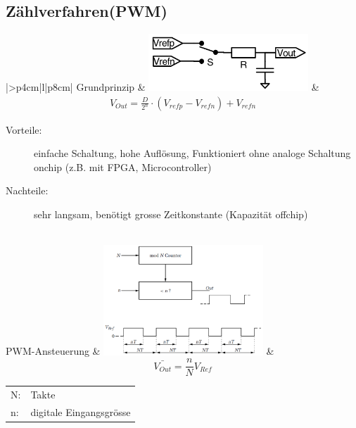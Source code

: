 \subsection{Zählverfahren(PWM)}
\begin{longtable}{|>{\bfseries}p{4cm}|l|p{8cm}|}
	\hline 
	Grundprinzip \hartl{466}
	& \includegraphics[width=6cm, valign=t]{./pictures/pwm_DAC.png}
	& {\begin{gather*}
		V_{Out}=\frac{D}{2^n} \cdot (V_{refp}-V_{refn})+V_{refn}
	  \end{gather*}}
	  \begin{description}
  		\item[Vorteile:] einfache Schaltung, hohe Auflösung, Funktioniert ohne analoge Schaltung onchip (z.B. mit FPGA, Microcontroller) 
  		\item[Nachteile:] sehr langsam, benötigt grosse Zeitkonstante (Kapazität offchip)
	  \end{description}
	\\ \hline
	PWM-Ansteuerung \hartl{466}
	& \includegraphics[width=6cm, valign=t]{./pictures/pwm_Ansteuerung.png}
	& {\begin{equation*}
		\bar{V_{Out}}=\frac{n}{N}V_{Ref}
	  \end{equation*}}
	  \begin{tabular}{ll}
		N:&Takte\\
		n:&digitale Eingangsgrösse
	  \end{tabular}
	\\ \hline
\end{longtable}


